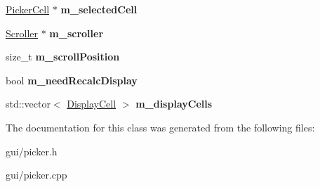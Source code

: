 \begin{DoxyCompactItemize}
\item 
\hyperlink{classPickerCell}{Picker\+Cell} $\ast$ {\bfseries m\+\_\+selected\+Cell}\hypertarget{classPicker_a035aa1e346a397fef0d93b86b7d1aeb9}{}\label{classPicker_a035aa1e346a397fef0d93b86b7d1aeb9}

\item 
\hyperlink{classScroller}{Scroller} $\ast$ {\bfseries m\+\_\+scroller}\hypertarget{classPicker_a7d05259c578a23da6fbcbd2f53cd1950}{}\label{classPicker_a7d05259c578a23da6fbcbd2f53cd1950}

\item 
size\+\_\+t {\bfseries m\+\_\+scroll\+Position}\hypertarget{classPicker_aab8484b50df0cedc515c5a04410881b1}{}\label{classPicker_aab8484b50df0cedc515c5a04410881b1}

\item 
bool {\bfseries m\+\_\+need\+Recalc\+Display}\hypertarget{classPicker_ad6af1faa43d0afef02a5922a792d8f4c}{}\label{classPicker_ad6af1faa43d0afef02a5922a792d8f4c}

\item 
std\+::vector$<$ \hyperlink{structPicker_1_1DisplayCell}{Display\+Cell} $>$ {\bfseries m\+\_\+display\+Cells}\hypertarget{classPicker_a68832392b4dbc38e1b648ddd0cc43978}{}\label{classPicker_a68832392b4dbc38e1b648ddd0cc43978}

\end{DoxyCompactItemize}


The documentation for this class was generated from the following files\+:\begin{DoxyCompactItemize}
\item 
gui/picker.\+h\item 
gui/picker.\+cpp\end{DoxyCompactItemize}
